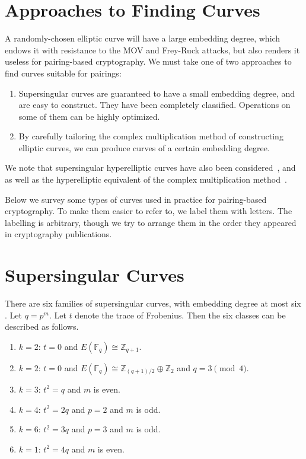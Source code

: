 \section {Approaches to Finding Curves}

A randomly-chosen elliptic curve will have a large embedding
degree, which endows it with resistance to the MOV and Frey-Ruck
attacks, but also renders it useless for pairing-based cryptography.
We must take one of two approaches to find curves suitable for pairings:

\begin{enumerate}
\item
Supersingular curves are guaranteed to have a small embedding degree,
and are easy to construct. They have been completely classified. Operations
on some of them can be highly optimized.
\item
By carefully tailoring the complex multiplication method of constructing
elliptic curves, we can produce curves of a certain embedding degree. 
\end{enumerate}

We note that supersingular hyperelliptic curves have also been
considered~\cite{galbraith, rubinsilverberg},
and as well as the hyperelliptic equivalent of the
complex multiplication method~\cite{freemanhyper}.

Below we survey some types of curves used in practice for pairing-based
cryptography. To make them easier to refer to, we label them with letters.
The labelling is arbitrary, though we try to arrange them in the order
they appeared in cryptography publications.

\section {Supersingular Curves}

There are six families of supersingular curves, with embedding degree at
most six \cite{mov}. Let $q=p^m$. Let $t$ denote the trace of Frobenius.
Then the six classes can be described as follows.

\begin{enumerate}
\item
$k = 2$: $ t = 0$ and $E(\mathbb{F}_q) \cong \mathbb{Z}_{q+1}$.
\item
$k = 2$: $ t = 0$ and $E(\mathbb{F}_q) \cong \mathbb{Z}_{(q+1)/2} \oplus \mathbb{Z}_2$ and $q = 3 \pmod{4}$.
\item
$k = 3$: $ t^2 = q$ and $m$ is even.
\item
$k = 4$: $ t^2 = 2q$ and $p = 2$ and $m$ is odd.
\item
$k = 6$: $ t^2 = 3q$ and $p = 3$ and $m$ is odd.
\item
$k = 1$: $ t^2 = 4q$ and $m$ is even.
\end{enumerate}

